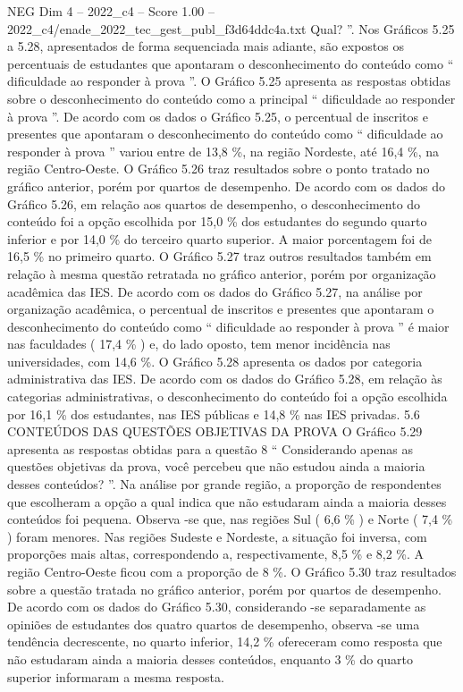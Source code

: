 \begin{textsample}{NEG Dim 4 – 2022\_c4 – Score 1.00 – 2022\_c4/enade\_2022\_tec\_gest\_publ\_f3d64ddc4a.txt}
Qual? ”.
Nos Gráficos 5.25 a 5.28, apresentados de forma sequenciada mais adiante, são expostos os percentuais de estudantes que apontaram o desconhecimento do conteúdo como “ dificuldade ao responder à prova ”.
O Gráfico 5.25 apresenta as respostas obtidas sobre o desconhecimento do conteúdo como a principal “ dificuldade ao responder à prova ”.
De acordo com os dados o Gráfico 5.25, o percentual de inscritos e presentes que apontaram o desconhecimento do conteúdo como “ dificuldade ao responder à prova ” variou entre de 13,8 \%, na região Nordeste, até 16,4 \%, na região Centro-Oeste.
O Gráfico 5.26 traz resultados sobre o ponto tratado no gráfico anterior, porém por quartos de desempenho.
De acordo com os dados do Gráfico 5.26, em relação aos quartos de desempenho, o desconhecimento do conteúdo foi a opção escolhida por 15,0 \% dos estudantes do segundo quarto inferior e por 14,0 \% do terceiro quarto superior.
A maior porcentagem foi de 16,5 \% no primeiro quarto.
O Gráfico 5.27 traz outros resultados também em relação à mesma questão retratada no gráfico anterior, porém por organização acadêmica das IES.
De acordo com os dados do Gráfico 5.27, na análise por organização acadêmica, o percentual de inscritos e presentes que apontaram o desconhecimento do conteúdo como “ dificuldade ao responder à prova ” é maior nas faculdades ( 17,4 \% ) e, do lado oposto, tem menor incidência nas universidades, com 14,6 \%.
O Gráfico 5.28 apresenta os dados por categoria administrativa das IES.
De acordo com os dados do Gráfico 5.28, em relação às categorias administrativas, o desconhecimento do conteúdo foi a opção escolhida por 16,1 \% dos estudantes, nas IES públicas e 14,8 \% nas IES privadas. 5.6 CONTEÚDOS DAS QUESTÕES OBJETIVAS DA PROVA O Gráfico 5.29 apresenta as respostas obtidas para a questão 8 “ Considerando apenas as questões objetivas da prova, você percebeu que não estudou ainda a maioria desses conteúdos? ”.
Na análise por grande região, a proporção de respondentes que escolheram a opção a qual indica que não estudaram ainda a maioria desses conteúdos foi pequena.
Observa -se que, nas regiões Sul ( 6,6 \% ) e Norte ( 7,4 \% ) foram menores.
Nas regiões Sudeste e Nordeste, a situação foi inversa, com proporções mais altas, correspondendo a, respectivamente, 8,5 \% e 8,2 \%.
A região Centro-Oeste ficou com a proporção de 8 \%.
O Gráfico 5.30 traz resultados sobre a questão tratada no gráfico anterior, porém por quartos de desempenho.
De acordo com os dados do Gráfico 5.30, considerando -se separadamente as opiniões de estudantes dos quatro quartos de desempenho, observa -se uma tendência decrescente, no quarto inferior, 14,2 \% ofereceram como resposta que não estudaram ainda a maioria desses conteúdos, enquanto 3 \% do quarto superior informaram a mesma resposta.

\end{textsample}

